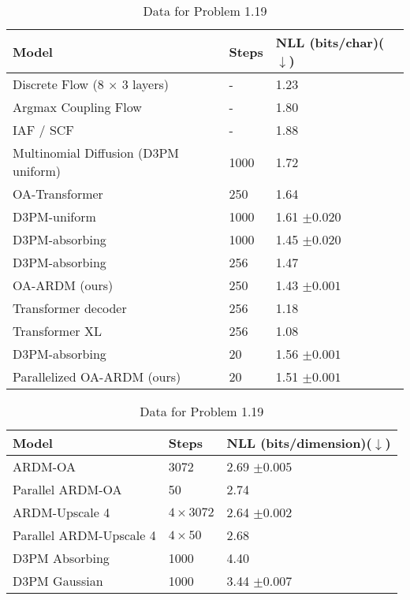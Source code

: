 \documentclass[12pt]{article}
\begin{document}
\begin{table}[ht]
	\centering
	\caption{Data for Problem 1.19\label{tab:1.19}}
	\begin{tabular}{l  l  l}
		\toprule
		Model                                & Steps & NLL (bits/char)($\downarrow$)
		\\
		\midrule
		Discrete Flow (8 $\times$ 3 layers)  & -     & 1.23                             \\
		Argmax Coupling Flow                 & -     & 1.80                             \\
		IAF / SCF                            & -     & 1.88                             \\
		Multinomial Diffusion (D3PM uniform) & 1000  & 1.72                             \\
		\midrule
		OA-Transformer                       & 250   & 1.64                             \\
		D3PM-uniform                         & 1000  & 1.61 {\footnotesize $\pm 0.020$} \\
		D3PM-absorbing                       & 1000  & 1.45 {\footnotesize $\pm 0.020$} \\
		D3PM-absorbing                       & 256   & 1.47                             \\
		OA-ARDM (ours)                       & 250   & 1.43 {\footnotesize $\pm0.001$}  \\
		Transformer decoder                  & 256   & 1.18                             \\
		Transformer XL                       & 256   & 1.08                             \\
		\midrule
		D3PM-absorbing                       & 20    & 1.56 {\footnotesize $\pm0.001$}  \\
		Parallelized OA-ARDM (ours)          & 20    & 1.51 {\footnotesize $\pm0.001$}  \\
		\bottomrule
	\end{tabular}
\end{table}

\begin{table}[ht]
	\centering
	\caption{Data for Problem 1.19\label{tab:1.19}}
	\begin{tabular}{l  l  l}
		\toprule
		Model                   & Steps         & NLL (bits/dimension)($\downarrow$)
		\\
		\midrule
		ARDM-OA                 & 3072          & 2.69 {\footnotesize $\pm0.005$}    \\
		Parallel ARDM-OA        & 50            & 2.74                               \\
		\midrule
		ARDM-Upscale 4          & $4\times3072$ & 2.64 {\footnotesize $\pm 0.002$}   \\
		Parallel ARDM-Upscale 4 & $4\times50$   & 2.68                               \\
		\midrule
		D3PM Absorbing          & 1000          & 4.40                               \\
		D3PM Gaussian           & 1000          & 3.44 {\footnotesize $\pm0.007$}    \\
		\bottomrule
	\end{tabular}
\end{table}
\end{document}
